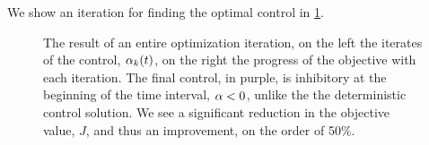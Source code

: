 \documentclass{article}
\begin{document}
We show an iteration for finding the optimal control in
\cref{fig:FP_adjoint_objective_control_convergence}.
\begin{figure}[h]
\begin{center}
\caption[ ]{The result of an entire optimization iteration, on the left the
iterates of the control, ${\alpha}_k(t)$, on the right the progress of the
objective with each iteration. The final control, in purple, is inhibitory at
the beginning of the time interval, ${\alpha} < 0$, unlike the the deterministic
control solution. 
We see a significant
reduction in the objective value, $J$, and thus an improvement, on the
order of 50\%.}
\label{fig:FP_adjoint_objective_control_convergence}
\end{center}
\end{figure}
\end{document}
